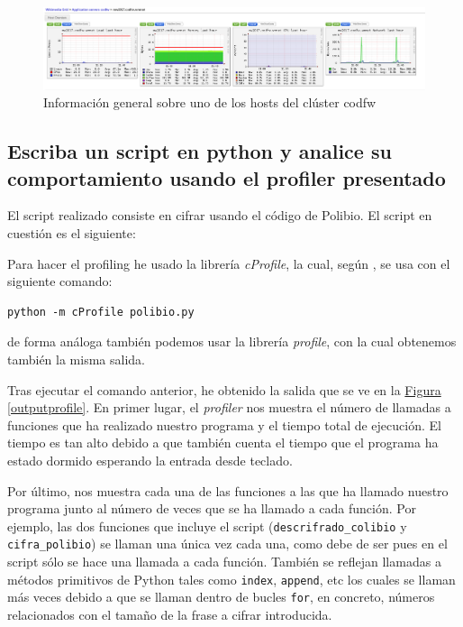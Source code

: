 \documentclass[10pt,a4paper,spanish]{article}
\numberwithin{equation}{section} %
\numberwithin{figure}{section} %
\numberwithin{table}{section} %
\begin{document}
\begin{figure}[!h]
    \centering
    \includegraphics[width=1\textwidth]{3_52}
    \caption{Información general sobre uno de los hosts del clúster codfw}
    \label{codfwhost}
\end{figure}

\setcounter{subsection}{8}
\subsection{Escriba un script en python y analice su comportamiento usando el profiler presentado}
El script realizado consiste en cifrar usando el código de Polibio\cite{polibio}. El script en cuestión es el siguiente:

\newpage
{}

Para hacer el profiling he usado la librería \textit{cProfile}, la cual, según \cite{pyprofile}, se usa con el siguiente comando:

\begin{verbatim}
python -m cProfile polibio.py
\end{verbatim}

de forma análoga también podemos usar la librería \textit{profile}, con la cual obtenemos también la misma salida.

Tras ejecutar el comando anterior, he obtenido la salida que se ve en la \hyperref[outputprofile]{Figura \ref*{outputprofile}}. En primer lugar, el \textit{profiler} nos muestra el número de llamadas a funciones que ha realizado nuestro programa y el tiempo total de ejecución. El tiempo es tan alto debido a que también cuenta el tiempo que el programa ha estado dormido esperando la entrada desde teclado.

Por último, nos muestra cada una de las funciones a las que ha llamado nuestro programa junto al número de veces que se ha llamado a cada función. Por ejemplo, las dos funciones que incluye el script (\texttt{descrifrado\_colibio} y \texttt{cifra\_polibio}) se llaman una única vez cada una, como debe de ser pues en el script sólo se hace una llamada a cada función. También se reflejan llamadas a métodos primitivos de Python tales como \texttt{index}, \texttt{append}, etc los cuales se llaman más veces debido a que se llaman dentro de bucles \texttt{for}, en concreto, números relacionados con el tamaño de la frase a cifrar introducida.
\end{document}
